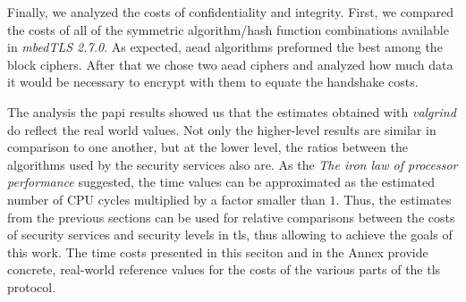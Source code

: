 Finally, we analyzed the costs of confidentiality and integrity. First, we compared the costs of all of the
symmetric algorithm/hash function combinations available in \textit{mbedTLS 2.7.0}. As expected,
\gls{aead} algorithms preformed the best among the block ciphers. After that we chose two \gls{aead} ciphers and
analyzed how much data it would be necessary to encrypt with them to equate the handshake costs.

The analysis the \gls{papi} results showed us that the estimates obtained with \textit{valgrind} do reflect the real world values. 
Not only the higher-level results are similar in comparison to one another, but at the lower level, the ratios between the algorithms 
used by the security services also are. As the \textit{The iron law of processor performance} suggested, the time values can be approximated as 
the estimated number of CPU cycles multiplied by a factor smaller than $1$. Thus, the estimates from the previous sections can be used for 
relative comparisons between the costs of security services and security levels in \gls{tls}, thus allowing to achieve the goals of this work. 
The time costs presented in this seciton and in the Annex provide concrete, real-world reference values for the costs of the various parts of 
the \gls{tls} protocol.